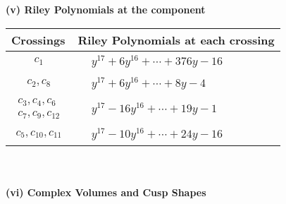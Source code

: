 \documentclass[1p]{elsarticle_modified}
\theoremstyle{definition}
\begin{document}
\newpage\renewcommand{\arraystretch}{1}
\flushleft \textbf{(v) Riley Polynomials at the component}\newline \\
\begin{tabular}{m{50pt}|m{274pt}}
Crossings & \hspace{64pt}Riley Polynomials at each crossing \\
\hline $$\begin{aligned}c_{1}\end{aligned}$$&$\begin{aligned}
&y^{17}+6 y^{16}+\cdots+376 y-16
\end{aligned}$\\
\hline $$\begin{aligned}c_{2},c_{8}\end{aligned}$$&$\begin{aligned}
&y^{17}+6 y^{16}+\cdots+8 y-4
\end{aligned}$\\
\hline $$\begin{aligned}c_{3},c_{4},c_{6}\\c_{7},c_{9},c_{12}\end{aligned}$$&$\begin{aligned}
&y^{17}-16 y^{16}+\cdots+19 y-1
\end{aligned}$\\
\hline $$\begin{aligned}c_{5},c_{10},c_{11}\end{aligned}$$&$\begin{aligned}
&y^{17}-10 y^{16}+\cdots+24 y-16
\end{aligned}$\\
\hline
\end{tabular}\\~\\
\newpage\flushleft \textbf{(vi) Complex Volumes and Cusp Shapes}
\end{document}
